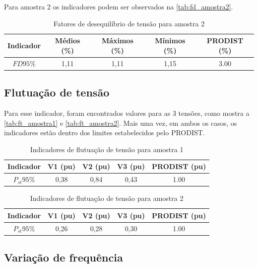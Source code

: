 Para amostra 2 os indicadores podem ser observados na \autoref{tab:fd_amostra2}.

\begin{table}[H]
  \centering
  \caption{Fatores de desequilíbrio de tensão para amostra 2}
  \label{tab:fd_amostra2}
  \begin{tabular}{@{}ccccc@{}}
    \toprule
    Indicador & Médios (\%) & Máximos (\%) & Mínimos (\%) & PRODIST (\%) \\
    \midrule
    $FD95\%$  & 1,11 & 1,11 & 1,15 & 3.00 \\
    \bottomrule
  \end{tabular}
\end{table}

\subsection{Flutuação de tensão}

Para esse indicador, foram encontrados valores para as 3 tensões, como mostra a \autoref{tab:ft_amostra1} e \autoref{tab:ft_amostra2}. Mais uma vez, em ambos os casos, os indicadores estão dentro dos limites estabelecidos pelo PRODIST.

\begin{table}[H]
  \centering
  \caption{Indicadores de flutuação de tensão para amostra 1}
  \label{tab:ft_amostra1}
  \begin{tabular}{@{}ccccc@{}}
    \toprule
    Indicador & V1 (pu) & V2 (pu) & V3 (pu) & PRODIST  (pu) \\
    \midrule
    $P_{st}95\%$   & 0,38 & 0,84 & 0,43 & 1.00 \\
    \bottomrule
  \end{tabular}
\end{table}


\begin{table}[H]
  \centering
  \caption{Indicadores de flutuação de tensão para amostra 2}
  \label{tab:ft_amostra2}
  \begin{tabular}{@{}ccccc@{}}
    \toprule
    Indicador & V1 (pu) & V2 (pu) & V3 (pu) & PRODIST  (pu) \\
    \midrule
    $P_{st}95\%$   & 0,26 & 0,28 & 0,30 & 1.00 \\
    \bottomrule
  \end{tabular}
\end{table}

\subsection{Variação de frequência}

